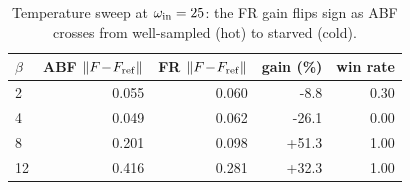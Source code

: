 \begin{table}[t]
\centering
\small
\caption{Temperature sweep at $\omega_{\rm in}=25$: the FR gain flips sign as ABF crosses from well-sampled (hot) to starved (cold).}
\label{tab:eb_beta}
\begin{tabular}{lrrrr}
\toprule
$\beta$ & ABF $\|F\!-\!F_{\rm ref}\|$ & FR $\|F\!-\!F_{\rm ref}\|$ & gain (\%) & win rate \\
\midrule
2 & 0.055 & 0.060 & -8.8 & 0.30 \\
4 & 0.049 & 0.062 & -26.1 & 0.00 \\
8 & 0.201 & 0.098 & +51.3 & 1.00 \\
12 & 0.416 & 0.281 & +32.3 & 1.00 \\
\bottomrule
\end{tabular}
\end{table}
